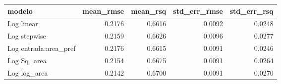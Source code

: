 \documentclass[
  letterpaper,
  DIV=11,
  numbers=noendperiod]{scrartcl}
\newcounter{none} %
\begin{document}
{\def\LTcaptype{none} %
\begin{longtable}[]{@{}lrrrr@{}}
\toprule\noalign{}
modelo & mean\_rmse & mean\_rsq & std\_err\_rmse & std\_err\_rsq \\
\midrule\noalign{}
\endhead
\bottomrule\noalign{}
\endlastfoot
Log linear & 0.2176 & 0.6616 & 0.0092 & 0.0248 \\
Log stepwise & 0.2159 & 0.6626 & 0.0096 & 0.0277 \\
Log entrada:area\_pref & 0.2176 & 0.6615 & 0.0091 & 0.0246 \\
Log Sq\_area & 0.2154 & 0.6675 & 0.0091 & 0.0264 \\
Log log\_area & 0.2142 & 0.6700 & 0.0091 & 0.0270 \\
\end{longtable}
}
\end{document}

